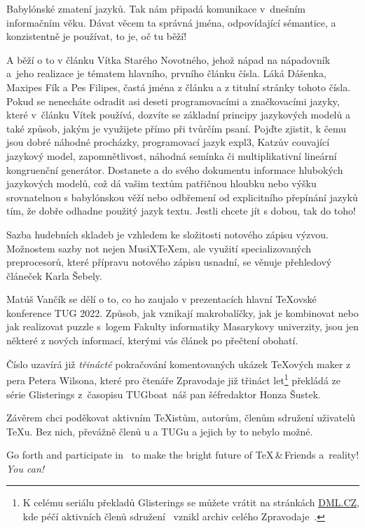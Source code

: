 \documentclass{csbulletin}
\def\TUG{TUG}
\def\TUGboat{TUGboat}
\begin{document}
Babylónské zmatení jazyků.
Tak nám připadá komunikace v~dnešním informačním věku.
Dávat věcem ta správná jména, odpovídající sémantice, a konzistentně je používat, to je, oč tu běží!

A běží o to v článku Vítka Starého Novotného, jehož nápad na nápadovník a~jeho realizace je tématem hlavního, prvního článku čísla. Láká Dášenka, Maxipes Fík a Pes Filipes, častá jména z článku a z titulní stránky tohoto čísla.
Pokud se ne\-necháte odradit asi deseti programovacími a značkovacími jazyky, které v~článku Vítek používá, dozvíte se základní principy jazykových modelů a také způsob, jakým je využijete přímo při tvůrčím psaní.
Pojďte zjistit, k čemu jsou dobré náhodné procházky, programovací jazyk expl3, Katzův couvající jazykový model, zapomnětlivost, náhodná semínka či multi\-plikativní lineární kongruenční generátor.  
Dostanete  a do svého dokumentu informace hlubokých jazykových modelů, což dá vašim textům patřičnou hloubku nebo výšku srovnatelnou s babylónskou věží nebo odbřemení od explicitního přepínání jazyků tím, že  dobře odhadne použitý jazyk textu.
Jestli chcete jít s dobou, tak do toho!

Sazba hudebních skladeb je vzhledem ke složitosti notového zápisu výzvou. Možnostem sazby not nejen MusiX\TeX em, ale využití specializovaných preprocesorů, které přípravu notového zápisu usnadní, se věnuje přehledový článeček Karla Šebely.

Matúš Vančík se dělí o to, co ho zaujalo v prezentacích hlavní \TeX ovské konference TUG 2022.
Způsob, jak vznikají makrobalíčky, jak je kombinovat nebo jak realizovat puzzle s~logem Fakulty informatiky Masarykovy univerzity, jsou jen některé z nových informací, kterými vás článek po přečtení obohatí.

Číslo uzavírá již \emph{třinácté} pokračování komentovaných ukázek \TeX ových maker z pera Petera Wilsona, které pro čtenáře Zpravodaje již třináct let\footnote{K 
{celému seriálu překladů Glisterings} se můžete vrátit na stránkách \href{https://dml.cz}{DML.CZ}, kde péčí aktivních členů sdružení~\cite{tex:vrabcova2022,tex:NovotnyVH2021} vznikl archiv celého Zpravodaje~\cite{tex:Zpravodaj}.} překládá ze série Glisterings z~časopisu \TUGboat\ náš pan šéfredaktor Honza Šustek.

\medskip
Závěrem chci poděkovat aktivním \TeX istům, autorům, členům sdružení
uživatelů \TeX u.
Bez nich, převážně členů \CSTUG u a \TUG u a jejich  by to nebylo možné.

\printbibliography
 
\begin{summary}
Go forth and participate in \CSTUG\ to make the bright future of \TeX\,\&\,Friends a~reality!
\emph{You can!}
\end{summary}
\end{document}
